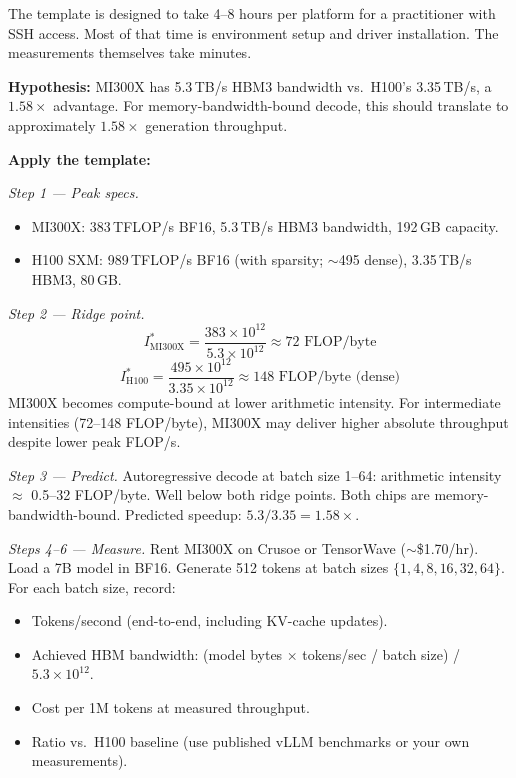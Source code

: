 The template is designed to take 4--8 hours per platform for a practitioner with SSH access. Most of that time is environment setup and driver installation. The measurements themselves take minutes.

\medskip

\begin{exercise}
\textbf{Hypothesis:} MI300X has 5.3\,TB/s HBM3 bandwidth vs.\ H100's 3.35\,TB/s, a $1.58\times$ advantage. For memory-bandwidth-bound decode, this should translate to approximately $1.58\times$ generation throughput.

\textbf{Apply the template:}

\textit{Step 1 --- Peak specs.}
\begin{itemize}
  \item MI300X: 383\,TFLOP/s BF16, 5.3\,TB/s HBM3 bandwidth, 192\,GB capacity.
  \item H100 SXM: 989\,TFLOP/s BF16 (with sparsity; $\sim$495 dense), 3.35\,TB/s HBM3, 80\,GB.
\end{itemize}

\textit{Step 2 --- Ridge point.}
$$I^*_{\text{MI300X}} = \frac{383 \times 10^{12}}{5.3 \times 10^{12}} \approx 72 \text{ FLOP/byte}$$
$$I^*_{\text{H100}} = \frac{495 \times 10^{12}}{3.35 \times 10^{12}} \approx 148 \text{ FLOP/byte (dense)}$$
MI300X becomes compute-bound at lower arithmetic intensity. For intermediate intensities (72--148 FLOP/byte), MI300X may deliver higher absolute throughput despite lower peak FLOP/s.

\textit{Step 3 --- Predict.} Autoregressive decode at batch size 1--64: arithmetic intensity $\approx$ 0.5--32 FLOP/byte. Well below both ridge points. Both chips are memory-bandwidth-bound. Predicted speedup: $5.3 / 3.35 = 1.58\times$.

\textit{Steps 4--6 --- Measure.} Rent MI300X on Crusoe or TensorWave ($\sim$\$1.70/hr). Load a 7B model in BF16. Generate 512 tokens at batch sizes $\{1, 4, 8, 16, 32, 64\}$. For each batch size, record:
\begin{itemize}
  \item Tokens/second (end-to-end, including KV-cache updates).
  \item Achieved HBM bandwidth: (model bytes $\times$ tokens/sec / batch size) / $5.3 \times 10^{12}$.
  \item Cost per 1M tokens at measured throughput.
  \item Ratio vs.\ H100 baseline (use published vLLM benchmarks or your own measurements).
\end{itemize}


\end{exercise}
